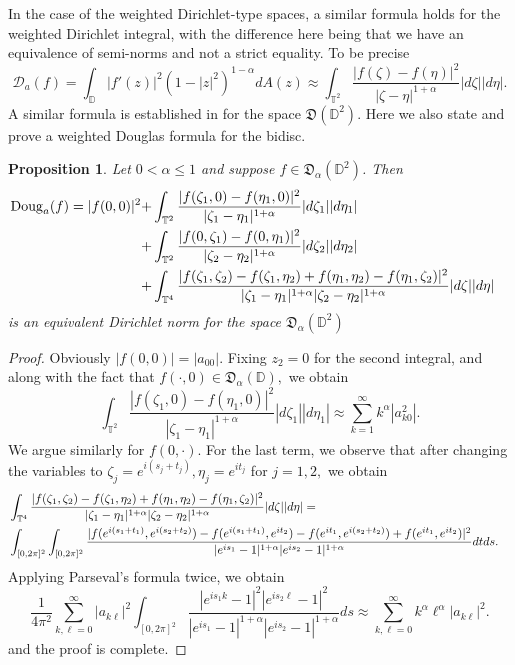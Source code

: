 \documentclass[11pt]{amsart}
\newtheorem{proposition}[theorem]{Proposition}
\numberwithin{equation}{section}
\begin{document}
In the case of the weighted Dirichlet-type spaces, a similar formula holds for the weighted Dirichlet integral, with the difference here being that we have an equivalence of semi-norms and not a strict equality. To be precise
$$\mathcal{D}_{a}(f)=\int_{\mathbb{D}}|f'(z)|^2(1-|z|^2)^{1-\alpha}dA(z)\approx\int_{\mathbb{T}^2}\frac{|f(\zeta)-f(\eta)|^2}{|\zeta-\eta|^{1+\alpha}}|d\zeta||d\eta|.$$
A similar formula is established in \cite{PLMS} for the space $\mathfrak{D}(\mathbb{D}^2)$. Here we also state and prove a weighted Douglas formula for the bidisc.
\begin{proposition} Let $0<\alpha\leq 1$ and suppose $f\in\mathfrak{D}_{\alpha}(\mathbb{D}^2)$. Then 
\begin{align}
\mathrm{Doug}_{a}(f)=|f(0,0)|^2+&\int_{\mathbb{T}^2}\frac{|f(\zeta_1,0)-f(\eta_1,0)|^2}{|\zeta_1-\eta_1|^{1+\alpha}}|d\zeta_1||d\eta_1| &&\\
                    +&\int_{\mathbb{T}^2}\frac{|f(0,\zeta_1)-f(0,\eta_1)|^2}{|\zeta_2-\eta_2|^{1+\alpha}}|d\zeta_2||d\eta_2| \notag &&\\
                    +&\int_{\mathbb{T}^4}\frac{|f(\zeta_1,\zeta_2)-f(\zeta_1,\eta_2)+f(\eta_1,\eta_2)-f(\eta_1,\zeta_2)|^2}{|\zeta_1-\eta_1|^{1+\alpha}|\zeta_2-\eta_2|^{1+\alpha}}|d\zeta||d\eta| \notag
\end{align}
is an equivalent Dirichlet norm for the space $\mathfrak{D}_{\alpha}(\mathbb{D}^2)$
\label{weighteddouglas}
\end{proposition}
\begin{proof} Obviously $|f(0,0)|=|a_{00}|.$ Fixing $z_2=0$ for the second integral, and along with the fact that $f(\cdot,0)\in \mathfrak{D}_{\alpha}(\mathbb{D}),$ we obtain 
$$\int_{\mathbb{T}^2}\frac{|f(\zeta_1,0)-f(\eta_1,0)|^2}{|\zeta_1-\eta_1|^{1+\alpha}}|d\zeta_1||d\eta_1|\approx\sum_{k=1}^{\infty}k^{\alpha}|a_{k0}^2|.$$
We argue similarly for $f(0,\cdot).$ For the last term, we observe that after changing the variables to $\zeta_j=e^{i(s_j+t_j)}, \eta_j=e^{it_j}$ for $j=1,2,$ we obtain
\begin{align}
&\int_{\mathbb{T}^4}\frac{|f(\zeta_1,\zeta_2)-f(\zeta_1,\eta_2)+f(\eta_1,\eta_2)-f(\eta_1,\zeta_2)|^2}{|\zeta_1-\eta_1|^{1+\alpha}|\zeta_2-\eta_2|^{1+\alpha}}|d\zeta||d\eta|= &&
\\
&\int_{[0,2\pi]^2}\int_{[0,2\pi]^2}\frac{|f(e^{i(s_1+t_1)},e^{i(s_2+t_2)})-f(e^{i(s_1+t_1)},e^{it_2})-f(e^{it_1},e^{i(s_2+t_2)})+f(e^{it_1},e^{it_2})|^2}{|e^{is_1}-1|^{1+\alpha}|e^{is_2}-1|^{1+\alpha}}dtds. \notag 
\end{align}
Applying Parseval's formula twice, we obtain
$$\frac{1}{4\pi^2}\sum_{k,\ell=0}^{\infty}|a_{k\ell}|^2\int_{[0,2\pi]^2}\frac{|e^{is_1k}-1|^2|e^{is_2\ell}-1|^2}{|e^{is_1}-1|^{1+\alpha}|e^{is_2}-1|^{1+\alpha}}ds\approx\sum_{k,\ell=0}^{\infty}k^{\alpha}\ell^{\alpha}|a_{k\ell}|^2.$$
and the proof is complete.
\end{proof} 
\end{document}
